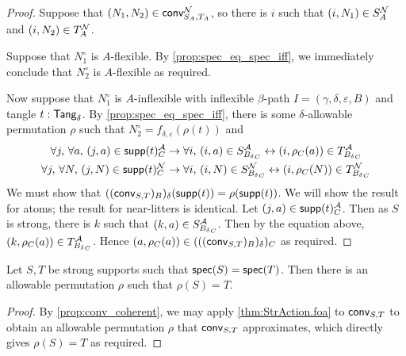 \begin{proof}
  Suppose that \( (N_1, N_2) \in \operatorname{\mathsf{conv}}_{S_A,T_A}^{\mathcal N} \), so there is \( i \) such that \( (i, N_1) \in S_A^{\mathcal N} \) and \( (i, N_2) \in T_A^{\mathcal N} \).

  Suppose that \( N_1^\circ \) is \( A \)-flexible.
  By \cref{prop:spec_eq_spec_iff}, we immediately conclude that \( N_2^\circ \) is \( A \)-flexible as required.

  Now suppose that \( N_1^\circ \) is \( A \)-inflexible with inflexible \( \beta \)-path \( I = (\gamma,\delta,\varepsilon,B) \) and tangle \( t : \mathsf{Tang}_\delta \).
  By \cref{prop:spec_eq_spec_iff}, there is some \( \delta \)-allowable permutation \( \rho \) such that \( N_2^\circ = f_{\delta,\varepsilon}(\rho(t)) \) and
  \begin{align*}
    \forall j,\, \forall a,\, (j, a) \in \operatorname{\mathsf{supp}}(t)_C^{\mathcal A} &\to \forall i,\, (i, a) \in S_{{B_\delta}_C}^{\mathcal A} \leftrightarrow (i, \rho_C(a)) \in T_{{B_\delta}_C}^{\mathcal A} \\
    \forall j,\, \forall N,\, (j, N) \in \operatorname{\mathsf{supp}}(t)_C^{\mathcal N} &\to \forall i,\, (i, N) \in S_{{B_\delta}_C}^{\mathcal N} \leftrightarrow (i, \rho_C(N)) \in T_{{B_\delta}_C}^{\mathcal N}
  \end{align*}
  We must show that \( ((\operatorname{\mathsf{conv}}_{S,T})_B)_\delta(\operatorname{\mathsf{supp}}(t)) = \rho(\operatorname{\mathsf{supp}}(t)) \).
  We will show the result for atoms; the result for near-litters is identical.
  Let \( (j, a) \in \operatorname{\mathsf{supp}}(t)_C^{\mathcal A} \).
  Then as \( S \) is strong, there is \( k \) such that \( (k, a) \in S_{{B_\delta}_C}^{\mathcal A} \).
  Then by the equation above, \( (k, \rho_C(a)) \in T_{{B_\delta}_C}^{\mathcal A} \).
  Hence \( (a, \rho_C(a)) \in (((\operatorname{\mathsf{conv}}_{S,T})_B)_\delta)_C \) as required.
\end{proof}
\begin{proposition}
  \label{prop:exists_allowable_of_spec_eq_spec}
  Let \( S, T \) be strong supports such that \( \operatorname{\mathsf{spec}}(S) = \operatorname{\mathsf{spec}}(T) \).
  Then there is an allowable permutation \( \rho \) such that \( \rho(S) = T \).
\end{proposition}
\begin{proof}
  By \cref{prop:conv_coherent}, we may apply \cref{thm:StrAction.foa} to \( \operatorname{\mathsf{conv}}_{S,T} \) to obtain an allowable permutation \( \rho \) that \( \operatorname{\mathsf{conv}}_{S,T} \) approximates, which directly gives \( \rho(S) = T \) as required.
\end{proof}

